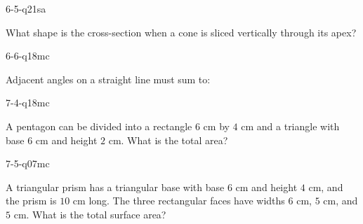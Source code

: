 \begin{practiceQuestion}{6-5-q21}{sa}
\begin{questionText}
What shape is the cross-section when a cone is sliced vertically through its apex?
\end{questionText}
\end{practiceQuestion}

\begin{practiceQuestion}{6-6-q18}{mc}
\begin{questionText}
Adjacent angles on a straight line must sum to:
\end{questionText}
\end{practiceQuestion}

\begin{practiceQuestion}{7-4-q18}{mc}
\begin{questionText}
A pentagon can be divided into a rectangle $6$ cm by $4$ cm and a triangle with base $6$ cm and height $2$ cm. What is the total area?
\end{questionText}
\end{practiceQuestion}

\begin{practiceQuestion}{7-5-q07}{mc}
\begin{questionText}
A triangular prism has a triangular base with base $6$ cm and height $4$ cm, and the prism is $10$ cm long. The three rectangular faces have widths $6$ cm, $5$ cm, and $5$ cm. What is the total surface area?
\end{questionText}
\end{practiceQuestion}

